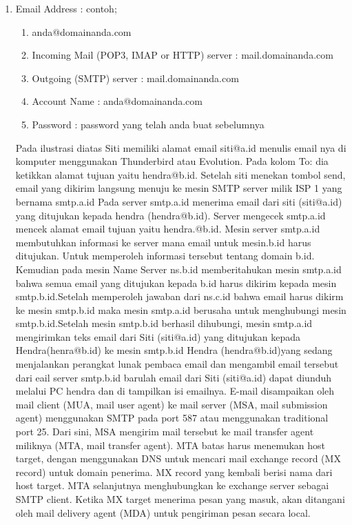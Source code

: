 \begin{enumerate}
\item Email Address : contoh; 
\begin{enumerate}
\item anda@domainanda.com 
\item Incoming Mail (POP3, IMAP or HTTP) server : mail.domainanda.com 
\item Outgoing (SMTP) server : mail.domainanda.com 
\item Account Name : anda@domainanda.com 
\item Password : password yang telah anda buat sebelumnya
\end{enumerate} 
Pada ilustrasi diatas Siti memiliki alamat email siti@a.id menulis email nya di komputer menggunakan Thunderbird atau Evolution. Pada kolom To: dia ketikkan alamat tujuan yaitu hendra@b.id. Setelah siti menekan tombol send, email yang dikirim langsung menuju ke mesin SMTP server milik ISP 1 yang bernama smtp.a.id
Pada server smtp.a.id menerima email dari siti (siti@a.id) yang ditujukan kepada hendra (hendra@b.id). Server mengecek smtp.a.id mencek alamat email tujuan yaitu hendra.@b.id. Mesin server smtp.a.id membutuhkan informasi ke server mana email untuk mesin.b.id harus ditujukan. Untuk memperoleh informasi tersebut tentang domain b.id. 
Kemudian pada mesin Name Server ns.b.id memberitahukan mesin smtp.a.id bahwa semua email yang ditujukan kepada b.id harus dikirim kepada mesin smtp.b.id.Setelah memperoleh jawaban dari ns.c.id bahwa email harus dikirm ke mesin smtp.b.id maka mesin smtp.a.id berusaha untuk menghubungi mesin smtp.b.id.Setelah mesin smtp.b.id berhasil dihubungi, mesin smtp.a.id mengirimkan teks email dari Siti (siti@a.id) yang ditujukan kepada Hendra(henra@b.id) ke mesin smtp.b.id 
Hendra (hendra@b.id)yang sedang menjalankan perangkat lunak pembaca email dan mengambil email tersebut dari eail server smtp.b.id barulah email dari Siti (siti@a.id) dapat diunduh melalui PC hendra dan di tampilkan isi emailnya. 
E-mail disampaikan oleh mail client (MUA, mail user agent) ke mail server (MSA, mail submission agent) menggunakan SMTP pada port 587 atau menggunakan traditional port 25. Dari sini, MSA mengirim mail tersebut ke mail transfer agent miliknya (MTA, mail transfer agent). MTA batas harus menemukan host target, dengan menggunakan DNS untuk mencari mail exchange record (MX record) untuk domain penerima. MX record yang kembali berisi nama dari host target. MTA selanjutnya menghubungkan ke exchange server sebagai SMTP client. Ketika MX target menerima pesan yang masuk, akan ditangani oleh mail delivery agent (MDA) untuk pengiriman pesan secara local. 

\end{enumerate}
